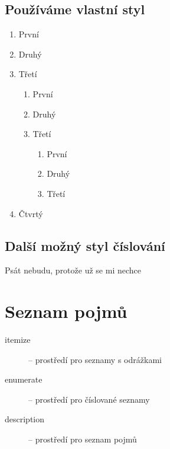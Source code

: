 \documentclass[10pt,a4paper]{article}
\begin{document}
		\subsection{Používáme vlastní styl}
			\begin{enumerate}
				\renewcommand{\labelenumi}{\arabic{enumi}.}
				\renewcommand{\labelenumii}{\arabic{enumi}.\arabic{enumii}.}
				\renewcommand{\labelenumiii}{\arabic{enumi}.\arabic{enumii}.\arabic{enumiii}.}
				\item První
				\item Druhý
				\item Třetí
					\begin{enumerate}
						\item První
						\item Druhý
						\item Třetí
							\begin{enumerate}
								\item První
								\item Druhý
								\item Třetí
							\end{enumerate}
					\end{enumerate}
				\item Čtvrtý	
			\end{enumerate}
			
		\subsection{Další možný styl číslování}
		Psát nebudu, protože už se mi nechce
		
	\section{Seznam pojmů}
	\label{seznam-pojmu}
	\begin{description}
		\item[itemize] -- prostředí pro seznamy s odrážkami	
		\item[enumerate] -- prostředí pro číslované seznamy
		\item[description] -- prostředí pro seznam pojmů
	\end{description}
	
\end{document}
